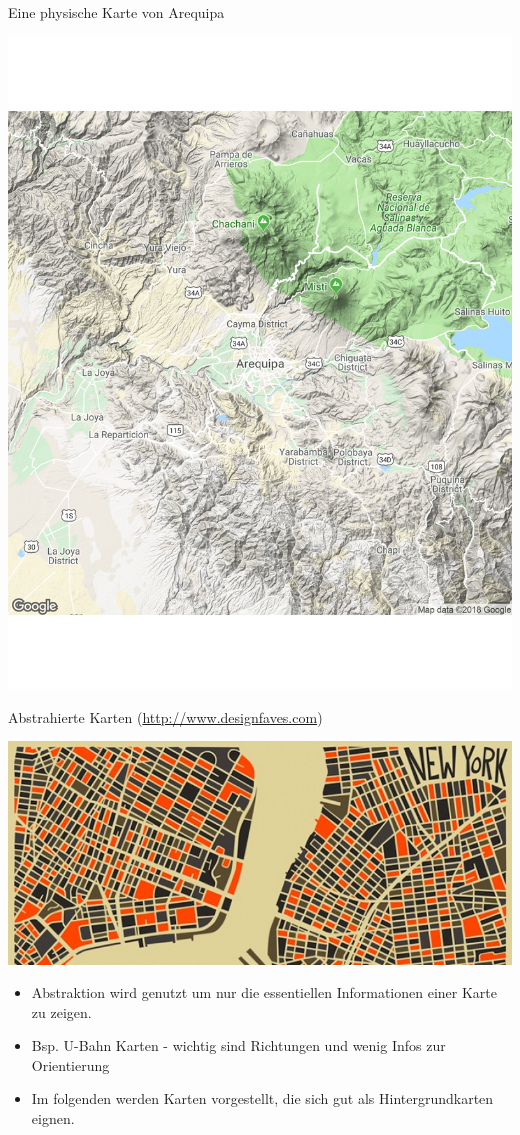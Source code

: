 \documentclass[ignorenonframetext,]{beamer}
\begin{document}
\begin{frame}{Eine physische Karte von Arequipa}

\includegraphics{figure/Areqipa.pdf}

\end{frame}

\begin{frame}{Abstrahierte Karten
(\href{http://www.designfaves.com/2014/03/abstracted-maps-reveal-cities-personalities}{http://www.designfaves.com})}

\includegraphics{figure/NYabstracted.jpg}

\begin{itemize}
\item
  Abstraktion wird genutzt um nur die essentiellen Informationen einer
  Karte zu zeigen.
\item
  Bsp. U-Bahn Karten - wichtig sind Richtungen und wenig Infos zur
  Orientierung
\item
  Im folgenden werden Karten vorgestellt, die sich gut als
  Hintergrundkarten eignen.
\end{itemize}

\end{frame}
\end{document}
